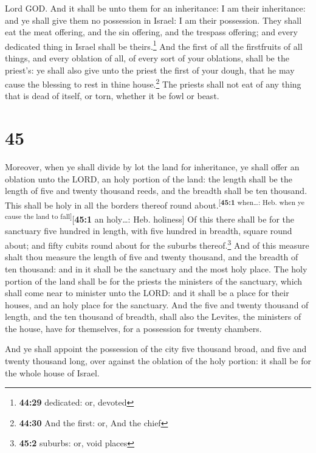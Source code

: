 Lord GOD.  And it shall be unto them for an inheritance:
I am their inheritance: and ye shall give them no possession in Israel:
I am their possession.  They shall eat the meat offering,
and the sin offering, and the trespass offering; and every dedicated
thing in Israel shall be theirs.\footnote{\textbf{44:29} dedicated: or,
  devoted}  And the first of all the firstfruits of all
things, and every oblation of all, of every sort of your oblations,
shall be the priest's: ye shall also give unto the priest the first of
your dough, that he may cause the blessing to rest in thine
house.\footnote{\textbf{44:30} And the first: or, And the chief}
 The priests shall not eat of any thing that is dead of
itself, or torn, whether it be fowl or beast.

\hypertarget{section-44}{%
\section{45}\label{section-44}}

 Moreover, when ye shall divide by lot the land for
inheritance, ye shall offer an oblation unto the LORD, an holy portion
of the land: the length shall be the length of five and twenty thousand
reeds, and the breadth shall be ten thousand. This shall be holy in all
the borders thereof round about.\textsuperscript{{[}\textbf{45:1}
when\ldots: Heb. when ye cause the land to fall{]}}{[}\textbf{45:1} an
holy\ldots: Heb. holiness{]}  Of this there shall be for
the sanctuary five hundred in length, with five hundred in breadth,
square round about; and fifty cubits round about for the suburbs
thereof.\footnote{\textbf{45:2} suburbs: or, void places} 
And of this measure shalt thou measure the length of five and twenty
thousand, and the breadth of ten thousand: and in it shall be the
sanctuary and the most holy place.  The holy portion of
the land shall be for the priests the ministers of the sanctuary, which
shall come near to minister unto the LORD: and it shall be a place for
their houses, and an holy place for the sanctuary.  And
the five and twenty thousand of length, and the ten thousand of breadth,
shall also the Levites, the ministers of the house, have for themselves,
for a possession for twenty chambers.

 And ye shall appoint the possession of the city five
thousand broad, and five and twenty thousand long, over against the
oblation of the holy portion: it shall be for the whole house of Israel.

